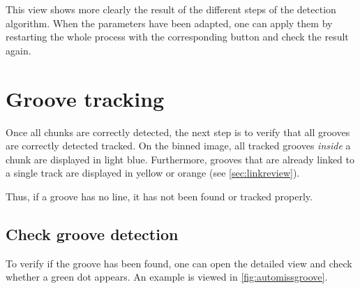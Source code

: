This view shows more clearly the result of the different steps of the detection algorithm. When the parameters have been adapted, one can apply them by restarting the whole process with the corresponding button and check the result again.

\section{Groove tracking}

Once all chunks are correctly detected, the next step is to verify that all grooves are correctly detected tracked. On the binned image, all tracked grooves \emph{inside} a chunk are displayed in light blue. Furthermore, grooves that are already linked to a single track are displayed in yellow or orange (see \autoref{sec:linkreview}).

Thus, if a groove has no line, it has not been found or tracked properly.

\subsection{Check groove detection}

To verify if the groove has been found, one can open the detailed view and check whether a green dot appears. An example is viewed in \autoref{fig:automissgroove}.

